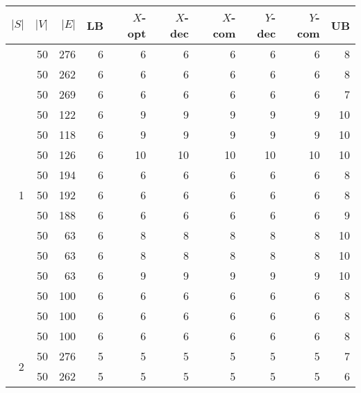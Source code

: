 \begin{table}[]
\begin{tabular}{rrrrrrrrrr}
$|S|$               & $|V|$ & $|E|$ & LB & $X$-opt & $X$-dec & $X$-com & $Y$-dec & $Y$-com & UB    \\\hline
\multirow{15}{*}{1} & 50  & 276   & 6  & 6       & 6       & 6       & 6       & 6       & 8  \\
                    & 50  & 262   & 6  & 6       & 6       & 6       & 6       & 6       & 8  \\
                    & 50  & 269   & 6  & 6       & 6       & 6       & 6       & 6       & 7  \\
                    & 50  & 122   & 6  & 9       & 9       & 9       & 9       & 9       & 10 \\
                    & 50  & 118   & 6  & 9       & 9       & 9       & 9       & 9       & 10 \\
                    & 50  & 126   & 6  & 10      & 10      & 10      & 10      & 10      & 10 \\
                    & 50  & 194   & 6  & 6       & 6       & 6       & 6       & 6       & 8  \\
                    & 50  & 192   & 6  & 6       & 6       & 6       & 6       & 6       & 8  \\
                    & 50  & 188   & 6  & 6       & 6       & 6       & 6       & 6       & 9  \\
                    & 50  & 63    & 6  & 8       & 8       & 8       & 8       & 8       & 10 \\
                    & 50  & 63    & 6  & 8       & 8       & 8       & 8       & 8       & 10 \\
                    & 50  & 63    & 6  & 9       & 9       & 9       & 9       & 9       & 10 \\
                    & 50  & 100   & 6  & 6       & 6       & 6       & 6       & 6       & 8  \\
                    & 50  & 100   & 6  & 6       & 6       & 6       & 6       & 6       & 8  \\
                    & 50  & 100   & 6  & 6       & 6       & 6       & 6       & 6       & 8  \\
\multirow{15}{*}{2} & 50  & 276   & 5  & 5       & 5       & 5       & 5       & 5       & 7     \\\hline
                    & 50  & 262   & 5  & 5       & 5       & 5       & 5       & 5       & 6     \\

\end{tabular}
\end{table}

